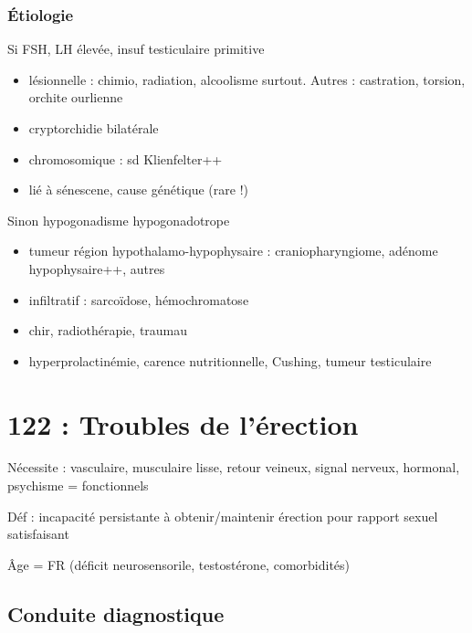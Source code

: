 \documentclass[11pt]{article}
\begin{document}
\subsubsection{Étiologie}
\label{sec:orgd6e9fa4}
Si FSH, LH élevée, insuf testiculaire primitive 
\begin{itemize}
\item lésionnelle : chimio, radiation, alcoolisme surtout. Autres : castration,
torsion, orchite ourlienne
\item cryptorchidie bilatérale
\item chromosomique : sd Klienfelter++
\item lié à sénescene, cause génétique (rare !)
\end{itemize}
Sinon hypogonadisme hypogonadotrope 
\begin{itemize}
\item tumeur région hypothalamo-hypophysaire : craniopharyngiome, adénome
hypophysaire++, autres
\item infiltratif : sarcoïdose, hémochromatose
\item chir, radiothérapie, traumau
\item hyperprolactinémie, carence nutritionnelle, Cushing, tumeur testiculaire
\end{itemize}

\section{122 : Troubles de l'érection}
\label{sec:org9e64969}
Nécessite : vasculaire, musculaire lisse, retour veineux, signal  nerveux,
hormonal, psychisme = fonctionnels

Déf : incapacité persistante à obtenir/maintenir érection pour rapport sexuel satisfaisant

Âge = FR (déficit neurosensorile, \inc testostérone, comorbidités)

\subsection{Conduite  diagnostique}
\label{sec:orga8ea044}
\end{document}
